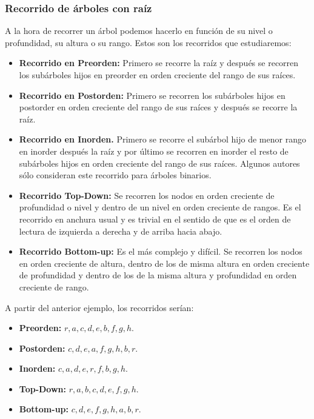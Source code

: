 \subsubsection{Recorrido de árboles con raíz}
A la hora de recorrer un árbol podemos hacerlo en función de su nivel o profundidad, su altura o su rango. Estos son los recorridos que estudiaremos:
\begin{itemize}
    \item\textbf{Recorrido en Preorden:} 
    Primero se recorre la raíz y después se recorren los subárboles hijos en preorder en orden creciente del rango de sus raíces.
    \item\textbf{Recorrido en Postorden:} 
    Primero se recorren los subárboles hijos en postorder en orden creciente del rango de sus raíces y después se recorre la raíz.
    \item\textbf{Recorrido en Inorden.} 
    Primero se recorre el subárbol hijo de menor rango en inorder después la raíz y por último se recorren en inorder el resto de subárboles hijos en orden creciente del rango de sus raíces. Algunos autores sólo consideran este recorrido para árboles binarios.
    \item\textbf{Recorrido Top-Down:} 
    Se recorren los nodos en orden creciente de profundidad o nivel y dentro de un nivel en orden creciente de rangos. Es el recorrido en anchura usual y es trivial en el sentido de que es el orden de lectura de izquierda a derecha y de arriba hacia abajo.
    \item\textbf{Recorrido Bottom-up:} 
    Es el más complejo y difícil. Se recorren los nodos en orden creciente de altura, dentro de los de misma altura en orden creciente de profundidad y dentro de los de la misma altura y profundidad en orden creciente de rango.
\end{itemize}
\begin{ejemplo}
    A partir del anterior ejemplo, los recorridos serían:
    \begin{itemize}
        \item\textbf{Preorden:} $r,a,c,d,e,b,f,g,h$.
        \item\textbf{Postorden:} $c,d,e,a,f,g,h,b,r$.
        \item\textbf{Inorden:} $c,a,d,e,r,f,b,g,h$.
        \item\textbf{Top-Down:} $r,a,b,c,d,e,f,g,h$.
        \item\textbf{Bottom-up:} $c,d,e,f,g,h,a,b,r$.
    \end{itemize}
\end{ejemplo}

